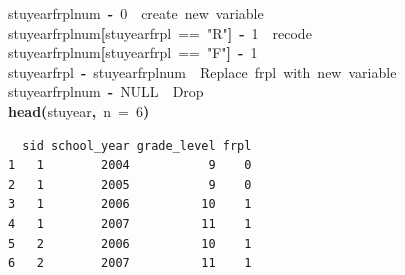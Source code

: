 \documentclass[12pt]{article}
\makeatletter
\newcommand{\hlnumber}[1]{\textcolor[rgb]{0,0,0}{#1}}%
\newcommand{\hlfunctioncall}[1]{\textcolor[rgb]{0.501960784313725,0,0.329411764705882}{\textbf{#1}}}%
\newcommand{\hlstring}[1]{\textcolor[rgb]{0.6,0.6,1}{#1}}%
\newcommand{\hlkeyword}[1]{\textcolor[rgb]{0,0,0}{\textbf{#1}}}%
\newcommand{\hlargument}[1]{\textcolor[rgb]{0.690196078431373,0.250980392156863,0.0196078431372549}{#1}}%
\newcommand{\hlcomment}[1]{\textcolor[rgb]{0.180392156862745,0.6,0.341176470588235}{#1}}%
\newcommand{\hlassignement}[1]{\textcolor[rgb]{0,0,0}{\textbf{#1}}}%
\newcommand{\hlsymbol}[1]{\textcolor[rgb]{0,0,0}{#1}}%
\newcommand{\hlstd}[1]{\textcolor[rgb]{0,0,0}{#1}}%
\newenvironment{kframe}{%
 \def\FrameCommand##1{\hskip\@totalleftmargin \hskip-\fboxsep
 \colorbox{shadecolor}{##1}\hskip-\fboxsep
     \hskip-\linewidth \hskip-\@totalleftmargin \hskip\columnwidth}%
 \MakeFramed {\advance\hsize-\width
   \@totalleftmargin\z@ \linewidth\hsize
   \@setminipage}}%
 {\par\unskip\endMakeFramed}
\newenvironment{knitrout}{}{} %
\renewenvironment{knitrout}{\begin{footnotesize}}{\end{footnotesize}}
\makeatother
\begin{document}
\begin{knitrout}
\color{fgcolor}\begin{kframe}
\begin{flushleft}
\ttfamily\noindent
\hlsymbol{stuyear}\hlkeyword{\usebox{\hlnormalsizeboxdollar}}\hlsymbol{frpl\usebox{\hlnormalsizeboxunderscore}num}{\ }\hlassignement{\usebox{\hlnormalsizeboxlessthan}-}{\ }\hlnumber{0}{\ }{\ }\hlcomment{\usebox{\hlnormalsizeboxhash}{\ }create{\ }new{\ }variable}\hspace*{\fill}\\
\hlstd{}\hlsymbol{stuyear}\hlkeyword{\usebox{\hlnormalsizeboxdollar}}\hlsymbol{frpl\usebox{\hlnormalsizeboxunderscore}num}\hlkeyword{[}\hlsymbol{stuyear}\hlkeyword{\usebox{\hlnormalsizeboxdollar}}\hlsymbol{frpl}{\ }=={\ }\hlstring{"{}R"{}}\hlkeyword{]}{\ }\hlassignement{\usebox{\hlnormalsizeboxlessthan}-}{\ }\hlnumber{1}{\ }{\ }\hlcomment{\usebox{\hlnormalsizeboxhash}recode}\hspace*{\fill}\\
\hlstd{}\hlsymbol{stuyear}\hlkeyword{\usebox{\hlnormalsizeboxdollar}}\hlsymbol{frpl\usebox{\hlnormalsizeboxunderscore}num}\hlkeyword{[}\hlsymbol{stuyear}\hlkeyword{\usebox{\hlnormalsizeboxdollar}}\hlsymbol{frpl}{\ }=={\ }\hlstring{"{}F"{}}\hlkeyword{]}{\ }\hlassignement{\usebox{\hlnormalsizeboxlessthan}-}{\ }\hlnumber{1}\hspace*{\fill}\\
\hlstd{}\hlsymbol{stuyear}\hlkeyword{\usebox{\hlnormalsizeboxdollar}}\hlsymbol{frpl}{\ }\hlassignement{\usebox{\hlnormalsizeboxlessthan}-}{\ }\hlsymbol{stuyear}\hlkeyword{\usebox{\hlnormalsizeboxdollar}}\hlsymbol{frpl\usebox{\hlnormalsizeboxunderscore}num}{\ }{\ }\hlcomment{\usebox{\hlnormalsizeboxhash}{\ }Replace{\ }frpl{\ }with{\ }new{\ }variable}\hspace*{\fill}\\
\hlstd{}\hlsymbol{stuyear}\hlkeyword{\usebox{\hlnormalsizeboxdollar}}\hlsymbol{frpl\usebox{\hlnormalsizeboxunderscore}num}{\ }\hlassignement{\usebox{\hlnormalsizeboxlessthan}-}{\ }NULL{\ }{\ }\hlcomment{\usebox{\hlnormalsizeboxhash}{\ }Drop}\hspace*{\fill}\\
\hlstd{}\hlfunctioncall{head}\hlkeyword{(}\hlsymbol{stuyear}\hlkeyword{,}{\ }\hlargument{n}{\ }\hlargument{=}{\ }\hlnumber{6}\hlkeyword{)}\mbox{}
\normalfont
\end{flushleft}
\begin{verbatim}
  sid school_year grade_level frpl
1   1        2004           9    0
2   1        2005           9    0
3   1        2006          10    1
4   1        2007          11    1
5   2        2006          10    1
6   2        2007          11    1
\end{verbatim}
\end{kframe}
\end{knitrout}
\end{document}
